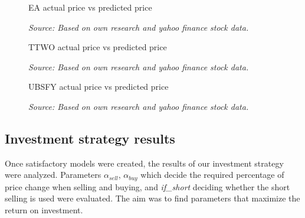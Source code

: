 \documentclass[11pt]{article} %
\begin{document}
\begin{figure}[H]
\caption{EA actual price vs predicted price}
\begin{adjustbox}{width=1.3\textwidth,center}

\end{adjustbox}
\caption*{\textit{Source: Based on own research and yahoo finance stock data.}}
\end{figure}

\begin{figure}[H]
\caption{TTWO actual price vs predicted price}
\begin{adjustbox}{width=1.3\textwidth,center}

\end{adjustbox}
\caption*{\textit{Source: Based on own research and yahoo finance stock data.}}
\end{figure}

\begin{figure}[H]
\caption{UBSFY actual price vs predicted price}
\begin{adjustbox}{width=1.3\textwidth,center}

\end{adjustbox}
\caption*{\textit{Source: Based on own research and yahoo finance stock data.}}
\end{figure}

\subsection{Investment strategy results}
Once satisfactory models were created, the results of our investment strategy were analyzed. Parameters  $\alpha_{sell}$, $\alpha_{buy}$  which decide the required percentage of price change when selling and buying, and \textit{if\_short} deciding whether the short selling is used were evaluated. The aim was to find parameters that maximize the return on investment.
\end{document}
